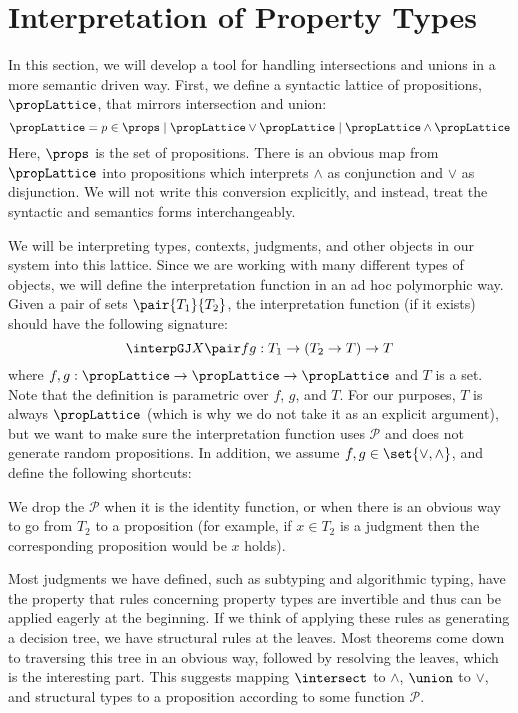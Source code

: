 
\section{Interpretation of Property Types}

In this section, we will develop a tool for handling intersections and unions in a more semantic driven way. First, we define a syntactic lattice of propositions, $\propLattice$, that mirrors intersection and union:
$$
\propLattice = p \in \props
             \mid \propLattice \vee \propLattice
             \mid \propLattice \wedge \propLattice
$$
Here, $\props$ is the set of propositions. There is an obvious map from $\propLattice$ into propositions which interprets $\wedge$ as conjunction and $\vee$ as disjunction. We will not write this conversion explicitly, and instead, treat the syntactic and semantics forms interchangeably.

We will be interpreting types, contexts, judgments, and other objects in our system into this lattice. Since we are working with many different types of objects, we will define the interpretation function in an ad hoc polymorphic way. Given a pair of sets $\pair {T_1} {T_2}$, the interpretation function (if it exists) should have the following signature:
$$
  \interpGJ X {\pair f g}  : T_1 \to (T_2 \to T) \to T
$$
where $f, g : \propLattice \to \propLattice \to \propLattice$ and $T$ is a set. Note that the definition is parametric over $f$, $g$, and $T$. For our purposes, $T$ is always $\propLattice$ (which is why we do not take it as an explicit argument), but we want to make sure the interpretation function uses $\mathcal P$ and does not generate random propositions. In addition, we assume $f,g \in \set{\vee, \wedge}$,  and define the following shortcuts:
 We drop the $\mathcal P$ when it is the identity function, or when there is an obvious way to go from $T_2$ to a proposition (for example, if $x \in T_2$ is a judgment then the corresponding proposition would be $x$ holds).

Most judgments we have defined, such as subtyping and algorithmic typing, have the property that rules concerning property types are invertible and thus can be applied eagerly at the beginning. If we think of applying these rules as generating a decision tree, we have structural rules at the leaves. Most theorems come down to traversing this tree in an obvious way, followed by resolving the leaves, which is the interesting part. This suggests mapping $\intersect$ to $\wedge$, $\union$ to $\vee$, and structural types to a proposition according to some function $\mathcal P$.

